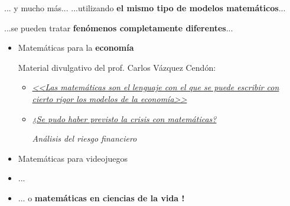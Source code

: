 \documentclass[
  unknownkeysallowed %
]{beamer}
\begin{document}
\begin{frame}{... y mucho más...}
  ...utilizando \textbf{el mismo tipo de modelos matemáticos}...
  \par\hfill ...se pueden tratar \alert{\bf fenómenos completamente diferentes}...
  \bigskip
  \begin{itemize}\itemsep1em
  \item Matemáticas para la \textbf{\alert{economía}}
    \par\bigskip
    Material divulgativo del prof. Carlos Vázquez Cendón:

    \begin{itemize}\itemsep0.5em
    \item
      \href{http://www.unir.net/empresa/revista/noticias/matematicas-para-la-economia/549201449354/}{\em
        <<Las matemáticas son el lenguaje con el que se puede escribir
        con cierto rigor los modelos de la economía>>}
    \item
      \href{http://www.rtve.es/alacarta/audios/eureka/eureka-se-pudo-haber-previsto-crisis-matematicas-31-05-13/1847482}{\em
        ¿Se pudo haber previsto la crisis con matemáticas?}
      \par\smallskip\hfill {\em Análisis del riesgo financiero}
    \end{itemize}
  \item Matemáticas para videojuegos
  \item ...
  \item ... o \textbf{\alert{matemáticas en ciencias de la vida} {\Large !}}
  \end{itemize}
\end{frame}
\end{document}
